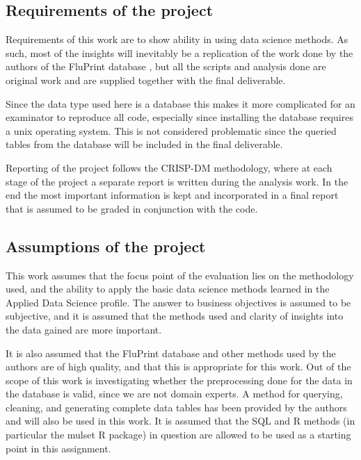 \subsection{Requirements of the project}

Requirements of this work are to show ability in using data science methods.
As such, most of the insights will inevitably be a replication of the work done
by the authors of the FluPrint database \cite{tomicSIMONAutomatedMachine2019},
but all the scripts and analysis done are original work and are supplied
together with the final deliverable.

Since the data type used here is a database this makes it more complicated for
an examinator to reproduce all code, especially since installing the database
requires a unix operating system. This is not considered problematic
since the queried tables from the database will be included in the final
deliverable.

Reporting of the project follows the CRISP-DM methodology, where at each
stage of the project a separate report is written during the analysis work. In
the end the most important information is kept and incorporated in a final
report that is assumed to be graded in conjunction with the code.

\subsection{Assumptions of the project}

This work assumes that the focus point of the evaluation lies on the
methodology used, and the ability to apply the basic data science methods
learned in the Applied Data Science profile. The answer to business objectives
is assumed to be subjective, and it is assumed that the methods used and
clarity of insights into the data gained are more important.

It is also assumed that the FluPrint database and other methods used by the
authors \cite{tomicFluPRINTDatasetMultidimensional2019,
tomicSIMONAutomatedMachine2019} are of high quality, and that this is
appropriate for this work. Out of the scope of this work is investigating
whether the preprocessing done for the data in the database is valid, since we
are not domain experts. A method for querying, cleaning, and generating
complete data tables has been provided by the authors and will also be used in
this work. It is assumed that the SQL and R methods (in particular the mulset R
package) in question are allowed to be used as a starting point in this
assignment.

